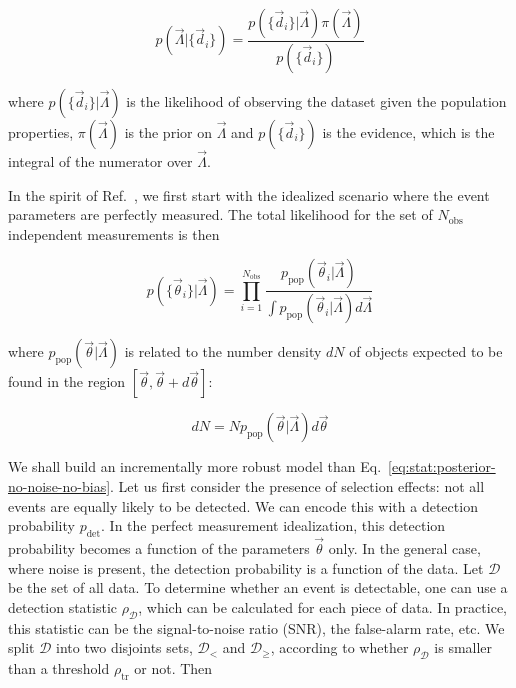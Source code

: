 \documentclass[%
preprint,
nofootinbib,
 amsmath,amssymb,
 aps,
]{revtex4-2}
\newcommand{\given}[2]{p( #1 | #2 )}
\newcommand{\ppop}[0]{p_{\text{pop}}}
\newcommand{\pdet}[0]{p_{\text{det}}}
\newcommand{\nobs}[0]{N_{\text{obs}}}
\begin{document}
\begin{equation}
	\given{\vec{\Lambda}}{\{\vec{d}_i \}} =
	\frac{\given{\{\vec{d}_i \}}{\vec{\Lambda}} \pi(\vec{\Lambda})}{p(\{\vec{d}_i \})}
\end{equation}

where $\given{\{\vec{d}_i \}}{\vec{\Lambda}}$ is the likelihood of observing the dataset given the
population properties, $\pi(\vec{\Lambda})$ is the prior on $\vec{\Lambda}$ and $p(\{\vec{d}_i \})$
is the evidence, which is the integral of the numerator over $\vec{\Lambda}$.

In the spirit of Ref.~, we first start with the idealized scenario where
the event parameters are perfectly measured. The total likelihood for the set of $\nobs$
independent measurements is then

\begin{equation}
	\label{eq:stat:posterior-no-noise-no-bias}
	\given{\{ \vec{\theta}_i \}}{\vec{\Lambda}} =
	\prod_{i=1}^{\nobs} \frac{\ppop(\vec{\theta}_i | \vec{\Lambda})}{\int \ppop(\vec{\theta}_i | \vec{\Lambda}) d\vec{\Lambda}}
\end{equation}

where $\ppop(\vec{\theta} | \vec{\Lambda})$ is related to the number density $dN$ of objects
expected to be found in the region $[\vec{\theta}, \vec{\theta} + d\vec{\theta}]$:

\begin{equation}
	\label{eq:stat:ppop}
	dN = N \ppop(\vec{\theta} | \vec{\Lambda}) d\vec{\theta}
\end{equation}

We shall build an incrementally more robust model than
Eq.~\eqref{eq:stat:posterior-no-noise-no-bias}. Let us first consider the presence of selection
effects: not all events are equally likely to be detected. We can encode this with a detection
probability $\pdet$. In the perfect measurement idealization, this detection probability becomes a
function of the parameters $\vec{\theta}$ only. In the general case, where noise is present, the
detection probability is a function of the data. Let $\mathcal{D}$ be the set of all data. To
determine whether an event is detectable, one can use a detection statistic $\rho_{\mathcal{D}}$,
which can be calculated for each piece of data. In practice, this statistic can be the
signal-to-noise ratio (SNR), the false-alarm rate, etc. We split $\mathcal{D}$ into two disjoints
sets, $\mathcal{D}_<$ and $\mathcal{D}_\geq$, according to whether $\rho_\mathcal{D}$ is smaller
than a threshold $\rho_{\text{tr}}$ or not. Then
\end{document}
